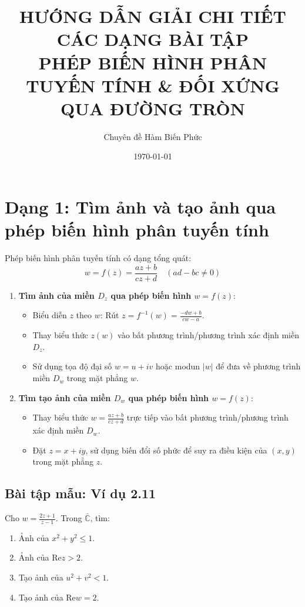 \documentclass[12pt,a4paper]{article}
\title{\textbf{HƯỚNG DẪN GIẢI CHI TIẾT CÁC DẠNG BÀI TẬP\\PHÉP BIẾN HÌNH PHÂN TUYẾN TÍNH \& ĐỐI XỨNG QUA ĐƯỜNG TRÒN}}
\author{Chuyên đề Hàm Biến Phức}
\date{\today}
\begin{document}
\maketitle

\tableofcontents
\newpage

\section{Dạng 1: Tìm ảnh và tạo ảnh qua phép biến hình phân tuyến tính}

\begin{tcolorbox}[title=Phương pháp giải tổng quát]
Phép biến hình phân tuyến tính có dạng tổng quát:
\[ w = f(z) = \frac{az + b}{cz + d} \quad (ad - bc \neq 0) \]
\begin{enumerate}
    \item \textbf{Tìm ảnh của miền $D_z$ qua phép biến hình $w = f(z)$}:
    \begin{itemize}
        \item Biểu diễn $z$ theo $w$: Rút $z = f^{-1}(w) = \frac{-dw + b}{cw - a}$.
        \item Thay biểu thức $z(w)$ vào bất phương trình/phương trình xác định miền $D_z$.
        \item Sử dụng tọa độ đại số $w = u + iv$ hoặc modun $|w|$ để đưa về phương trình miền $D_w$ trong mặt phẳng $w$.
    \end{itemize}
    
    \item \textbf{Tìm tạo ảnh của miền $D_w$ qua phép biến hình $w = f(z)$}:
    \begin{itemize}
        \item Thay biểu thức $w = \frac{az + b}{cz + d}$ trực tiếp vào bất phương trình/phương trình xác định miền $D_w$.
        \item Đặt $z = x + iy$, sử dụng biến đổi số phức để suy ra điều kiện của $(x, y)$ trong mặt phẳng $z$.
    \end{itemize}
\end{enumerate}
\end{tcolorbox}

\subsection*{Bài tập mẫu: Ví dụ 2.11}
Cho $w = \frac{2z + 1}{z - 1}$. Trong $\overline{\mathbb{C}}$, tìm:
\begin{enumerate}
    \item[a)] Ảnh của $x^2 + y^2 \le 1$.
    \item[b)] Ảnh của $\text{Re}z > 2$.
    \item[c)] Tạo ảnh của $u^2 + v^2 < 1$.
    \item[d)] Tạo ảnh của $\text{Re}w = 2$.
\end{enumerate}
\end{document}
